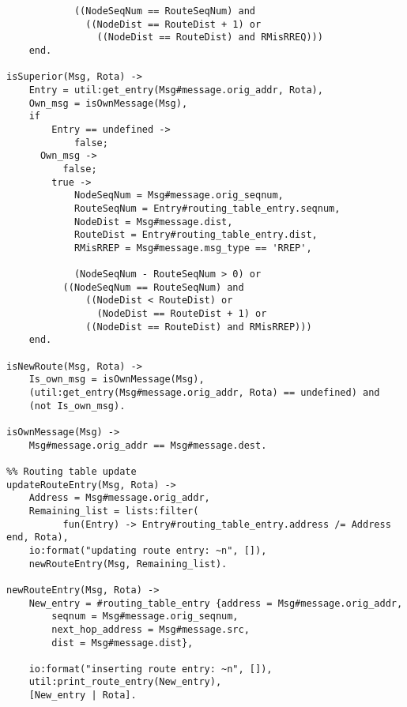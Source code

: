 \begin{verbatim}
            ((NodeSeqNum == RouteSeqNum) and
              ((NodeDist == RouteDist + 1) or
                ((NodeDist == RouteDist) and RMisRREQ)))
    end.

isSuperior(Msg, Rota) ->
    Entry = util:get_entry(Msg#message.orig_addr, Rota),
    Own_msg = isOwnMessage(Msg),
    if
        Entry == undefined ->
            false;
      Own_msg ->
          false;
        true ->
            NodeSeqNum = Msg#message.orig_seqnum,
            RouteSeqNum = Entry#routing_table_entry.seqnum,
            NodeDist = Msg#message.dist,
            RouteDist = Entry#routing_table_entry.dist,
            RMisRREP = Msg#message.msg_type == 'RREP',
            
            (NodeSeqNum - RouteSeqNum > 0) or
          ((NodeSeqNum == RouteSeqNum) and
              ((NodeDist < RouteDist) or
                (NodeDist == RouteDist + 1) or
              ((NodeDist == RouteDist) and RMisRREP)))
    end.

isNewRoute(Msg, Rota) ->
    Is_own_msg = isOwnMessage(Msg),
    (util:get_entry(Msg#message.orig_addr, Rota) == undefined) and
    (not Is_own_msg).

isOwnMessage(Msg) ->
    Msg#message.orig_addr == Msg#message.dest.

%% Routing table update
updateRouteEntry(Msg, Rota) ->
    Address = Msg#message.orig_addr,
    Remaining_list = lists:filter(
          fun(Entry) -> Entry#routing_table_entry.address /= Address end, Rota),
    io:format("updating route entry: ~n", []),
    newRouteEntry(Msg, Remaining_list).

newRouteEntry(Msg, Rota) ->
    New_entry = #routing_table_entry {address = Msg#message.orig_addr,
        seqnum = Msg#message.orig_seqnum,
        next_hop_address = Msg#message.src,
        dist = Msg#message.dist},
    
    io:format("inserting route entry: ~n", []),
    util:print_route_entry(New_entry),    
    [New_entry | Rota].    
\end{verbatim}
\normalsize
